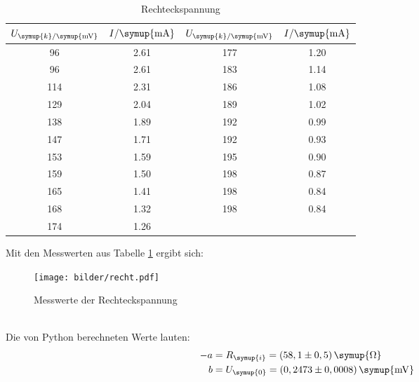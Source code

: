 \begin{table}[H]
  \centering
  \begin{tabular}{c c c c}
    \toprule
    $U_{\symup{k}/\symup{\si{\milli\volt}}}$ & $I/\symup{\si{\milli\ampere}}$  &
    $U_{\symup{k}/\symup{\si{\milli\volt}}}$ & $I/\symup{\si{\milli\ampere}}$  \\
    \midrule
     96   &  2.61  &  177  &  1.20  \\
     96   &  2.61  &  183  &  1.14  \\
    114   &  2.31  &  186  &  1.08  \\
    129   &  2.04  &  189  &  1.02  \\
    138   &  1.89  &  192  &  0.99  \\
    147   &  1.71  &  192  &  0.93  \\
    153   &  1.59  &  195  &  0.90  \\
    159   &  1.50  &  198  &  0.87  \\
    165   &  1.41  &  198  &  0.84  \\
    168   &  1.32  &  198  &  0.84  \\
    174   &  1.26  &  \hrulefill  & \hrulefill  \\
    \bottomrule
  \end{tabular}
  \caption{Rechteckspannung}
  \label{tab:recht}
\end{table}
Mit den Messwerten aus Tabelle \ref{tab:recht} ergibt sich:
\begin{figure}[h]
  \centering
  \texttt{[image: bilder/recht.pdf]}
  \caption{Messwerte der Rechteckspannung}
  \label{fig:re}
\end{figure}
\\
Die von Python berechneten Werte lauten:
\begin{align*}
   -a &= R_\symup{i} = (58,1 \pm 0,5)\, \symup{\si{\ohm}} \\ %
   b &= U_\symup{0} = (0,2473 \pm 0,0008)\,\symup{\si{\milli\volt}}
\end{align*}



